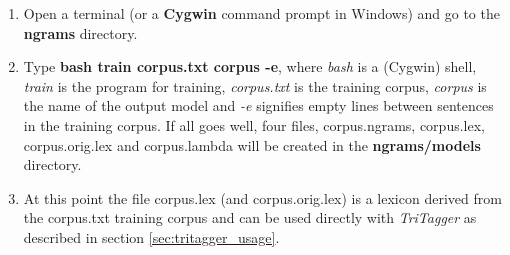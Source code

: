 \documentclass[11pt]{article}
\begin{document}
\begin{enumerate}
\item Open a terminal (or a \textbf{Cygwin} command prompt in Windows) and go to the \textbf{ngrams} directory.
\item Type {\bf bash train corpus.txt corpus -e}, where \emph{bash} is a (Cygwin) shell, \emph{train} is the program for training, \emph{corpus.txt} is the training corpus, \emph{corpus} is the name of the output model and \emph{-e} signifies empty lines between sentences in the training corpus.
If all goes well, four files, corpus.ngrams, corpus.lex, corpus.orig.lex and corpus.lambda will be created in the \textbf{ngrams/models} directory.
\item At this point the file corpus.lex (and corpus.orig.lex) is a lexicon derived from the corpus.txt training corpus and can be used directly with \emph{TriTagger} as described in section \ref{sec:tritagger_usage}.
\end{enumerate}
\end{document}
